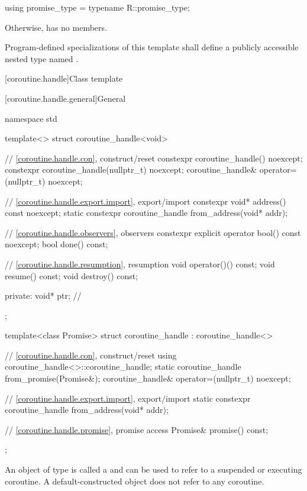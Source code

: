 \begin{codeblock}
using promise_type = typename R::promise_type;
\end{codeblock}

Otherwise,  has no members.

\pnum
Program-defined specializations of this template shall define a publicly
accessible nested type named .

[coroutine.handle]{Class template }

[coroutine.handle.general]{General}

%
\begin{codeblock}
namespace std {
  template<>
  struct coroutine_handle<void>
  {
    // \ref{coroutine.handle.con}, construct/reset
    constexpr coroutine_handle() noexcept;
    constexpr coroutine_handle(nullptr_t) noexcept;
    coroutine_handle& operator=(nullptr_t) noexcept;

    // \ref{coroutine.handle.export.import}, export/import
    constexpr void* address() const noexcept;
    static constexpr coroutine_handle from_address(void* addr);

    // \ref{coroutine.handle.observers}, observers
    constexpr explicit operator bool() const noexcept;
    bool done() const;

    // \ref{coroutine.handle.resumption}, resumption
    void operator()() const;
    void resume() const;
    void destroy() const;

  private:
    void* ptr;  // \expos
  };

  template<class Promise>
  struct coroutine_handle : coroutine_handle<>
  {
    // \ref{coroutine.handle.con}, construct/reset
    using coroutine_handle<>::coroutine_handle;
    static coroutine_handle from_promise(Promise&);
    coroutine_handle& operator=(nullptr_t) noexcept;

    // \ref{coroutine.handle.export.import}, export/import
    static constexpr coroutine_handle from_address(void* addr);

    // \ref{coroutine.handle.promise}, promise access
    Promise& promise() const;
  };
}
\end{codeblock}

\pnum
An object of type
 is called a 
and can be used to refer to a suspended or executing coroutine.
A default-constructed  object does not refer to any
coroutine.

